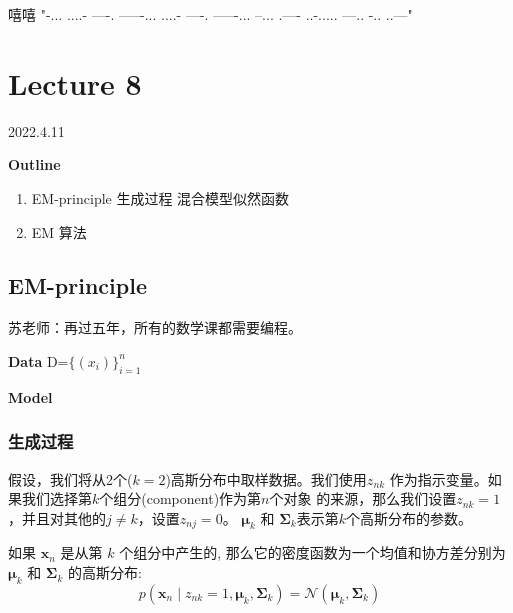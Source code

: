 \documentclass[UTF8]{ctexart}
\numberwithin{equation}{section}
\begin{document}

嘻嘻
"\--... ....- ----. -----\--... ....- ----. -----\--... --... .---- ..-.\-.... ---.. -.. ..---"

\newpage
\section{Lecture 8}
2022.4.11

\textbf{Outline}
\begin{enumerate}
    \item EM-principle
        \subitem 生成过程
        \subitem 混合模型似然函数
    \item EM 算法
\end{enumerate}

\subsection{EM-principle}
苏老师：再过五年，所有的数学课都需要编程。

\dotfill

\textbf{Data} D=$\{(x_i)\}_{i=1}^n$

\textbf{Model} 

\dotfill

\subsubsection{生成过程}

假设，我们将从2个($k=2$)高斯分布中取样数据。我们使用$z_{nk}$
作为指示变量。如果我们选择第$k$个组分(component)作为第$n$个对象
的来源，那么我们设置$z_{nk}=1$，并且对其他的$j\neq k$，设置$z_{nj}=0$。
$\boldsymbol{\mu}_{k}$ 和 $\boldsymbol{\Sigma}_{k}$表示第$k$个高斯分布的参数。

如果 $\boldsymbol{x}_{n}$ 是从第 $k$ 个组分中产生的, 
那么它的密度函数为一个均值和协方差分别为
$\boldsymbol{\mu}_{k}$ 和 $\boldsymbol{\Sigma}_{k}$ 
的高斯分布:
\begin{equation}
p\left(\boldsymbol{x}_{n} \mid z_{nk}=1, \boldsymbol{\mu}_{k}, \boldsymbol{\Sigma}_{k}\right)=\mathcal{N}\left(\boldsymbol{\mu}_{k}, \boldsymbol{\Sigma}_{k}\right)  
\end{equation}
\end{document}
